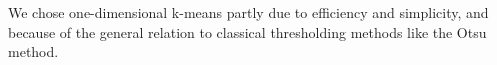 \documentclass[12pt]{spieman}  %
\begin{document}
\begin{spacing}{2}
We chose one-dimensional k-means partly due to efficiency and simplicity, and
because of the general relation to classical thresholding methods like the Otsu
method\cite{liuOtsuMethodKmeans2009}.










\end{spacing}
\end{document}
